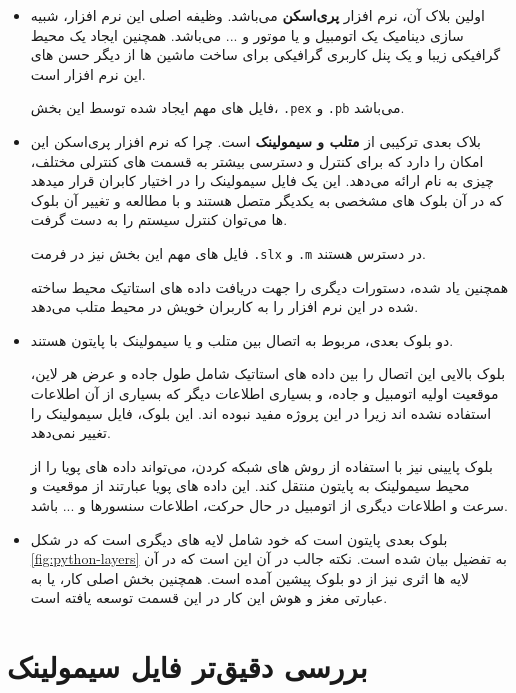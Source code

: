 \begin{itemize}
	\item 
	اولین بلاک آن، نرم افزار \textbf{پری‌اسکن }می‌باشد. وظیفه اصلی این نرم افزار، شبیه سازی دینامیک یک اتومبیل و یا موتور و ... می‌باشد. همچنین ایجاد یک محیط گرافیکی زیبا و یک پنل کاربری گرافیکی برای ساخت ماشین ها از دیگر حسن های این نرم افزار است.
	
	فایل های مهم ایجاد شده توسط این بخش، \texttt{.pex} و \texttt{.pb} می‌باشد.
	
	\item
	بلاک بعدی ترکیبی از \textbf{متلب و سیمولینک }است. چرا که نرم افزار پری‌اسکن این امکان را دارد که برای کنترل و دسترسی بیشتر به قسمت های کنترلی مختلف، چیزی به نام  ارائه می‌دهد. این  یک فایل سیمولینک را در اختیار کابران قرار میدهد که در آن بلوک های مشخصی به یکدیگر متصل هستند و با مطالعه و تغییر آن بلوک ها می‌توان کنترل سیستم را به دست گرفت.
	
	فایل های مهم این بخش نیز در فرمت \texttt{.slx} و \texttt{.m} در دسترس هستند.
	
	همچنین \api یاد شده، دستورات دیگری را جهت دریافت داده های استاتیک محیط ساخته شده در این نرم افزار را به کاربران خویش در محیط متلب می‌دهد.
	
	\item
	دو بلوک بعدی، مربوط به اتصال بین متلب و یا سیمولینک با پایتون هستند. 
	
	بلوک بالایی این اتصال را بین داده های استاتیک شامل طول جاده و عرض هر لاین، موقعیت اولیه اتومبیل و جاده، و بسیاری اطلاعات دیگر که بسیاری از آن اطلاعات استفاده نشده اند زیرا در این پروژه مفید نبوده اند. این بلوک، فایل سیمولینک را تغییر نمی‌دهد.
	
	بلوک پایینی نیز با استفاده از روش های شبکه کردن، می‌تواند داده های پویا را از محیط سیمولینک به پایتون منتقل کند. این داده های پویا عبارتند از موقعیت و سرعت و اطلاعات دیگری از اتومبیل در حال حرکت، اطلاعات سنسورها و ... باشد.
	
	\item 
	بلوک بعدی پایتون است که خود شامل لایه های دیگری است که در شکل 
	\ref{fig:python-layers}
	به تفضیل بیان شده است. نکته جالب در آن این است که در آن لایه ها اثری نیز از دو بلوک پیشین آمده است. همچنین بخش اصلی کار، یا به عبارتی مغز و هوش این کار در این قسمت توسعه یافته است.
\end{itemize}

\section{بررسی دقیق‌تر فایل سیمولینک}\label{ch:fani|sec:simulink}

